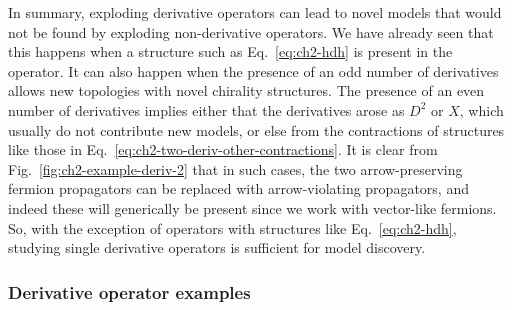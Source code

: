 In summary, exploding derivative operators can lead to novel models that would
not be found by exploding non-derivative operators. We have already seen that
this happens when a structure such as Eq.~\eqref{eq:ch2-hdh} is present in the
operator. It can also happen when the presence of an odd number of derivatives
allows new topologies with novel chirality structures. The presence of an even
number of derivatives implies either that the derivatives arose as $D^{2}$ or
$X$, which usually do not contribute new models, or else from the contractions
of structures like those in Eq.~\eqref{eq:ch2-two-deriv-other-contractions}. It is
clear from Fig.~\ref{fig:ch2-example-deriv-2} that in such cases, the two
arrow-preserving fermion propagators can be replaced with arrow-violating
propagators, and indeed these will generically be present since we work with
vector-like fermions. So, with the exception of operators with structures like
Eq.~\eqref{eq:ch2-hdh}, studying single derivative operators is sufficient for model
discovery.

\subsubsection{Derivative operator examples}
\label{sec:ch2-deriv-op-examples}

